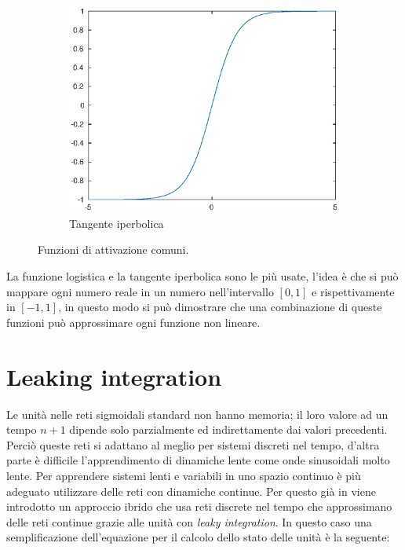 \begin{figure}[h!]
\begin{subfigure}[b]{0.30\textwidth}
		\includegraphics[width=\linewidth]{immagini/tanh}
		\caption{Tangente iperbolica}
		\label{att:(c)}
	\end{subfigure}%
	\caption{Funzioni di attivazione comuni.}\label{fattivazioni}
\end{figure}

La funzione logistica e la tangente iperbolica sono le più usate, l'idea è che si può mappare ogni numero reale in un numero nell'intervallo $[0,1]$ e rispettivamente in $[-1,1]$, in questo modo si può dimostrare che una combinazione di queste funzioni può approssimare ogni funzione non lineare.\\

\section{Leaking integration}
Le unità nelle reti  sigmoidali standard non hanno memoria; il loro valore ad un tempo $n+1$ dipende solo parzialmente ed indirettamente dai valori precedenti. Perciò queste reti si adattano al meglio per sistemi discreti nel tempo, d'altra parte è difficile l'apprendimento di dinamiche lente come onde sinusoidali molto lente. Per apprendere sistemi lenti e variabili in uno spazio continuo è più adeguato utilizzare delle reti con dinamiche continue. Per questo già in 
\cite{h} viene introdotto un approccio ibrido che usa reti discrete nel tempo che approssimano delle reti continue grazie alle unità con \textit{leaky integration}.
In questo caso una semplificazione dell'equazione per il calcolo dello stato delle unità è la seguente:

